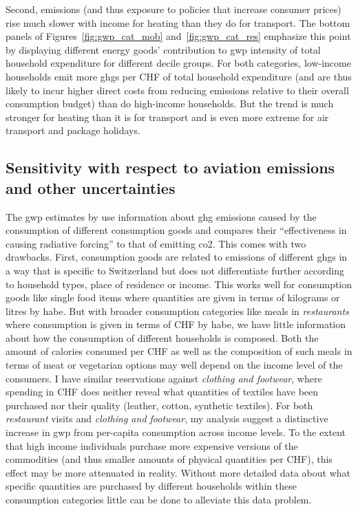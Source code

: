 \documentclass[referee, lineno, pdflatex,sn-apa]{sn-jnl}%
\theoremstyle{thmstyleone}%
\theoremstyle{thmstyletwo}%
\theoremstyle{thmstylethree}%
\begin{document}
Second, emissions (and thus exposure to policies that increase consumer prices) rise much slower with income for heating than they do for transport.
The bottom panels of Figures~\ref{fig:gwp_cat_mob} and~\ref{fig:gwp_cat_res} emphasize this point by displaying different energy goods' contribution to \ac{gwp} intensity of total household expenditure for different decile groups.
For both categories, low-income households emit more \acp{ghg} per CHF of total household expenditure (and are thus likely to incur higher direct costs from reducing emissions relative to their overall consumption budget) than do high-income households.
But the trend is much stronger for heating than it is for transport and is even more extreme for air transport and package holidays.

\clearpage

\subsection{Sensitivity with respect to aviation emissions and other uncertainties}
\label{sec:aviation}

The \ac{gwp} estimates by \citet{jakobs_nfp73_2023} use information about \ac{ghg} emissions caused by the consumption of different consumption goods and compares their ``effectiveness in causing radiative forcing'' to that of emitting \ac{co2}.
This comes with two drawbacks.
First, consumption goods are related to emissions of different \acp{ghg} in a way that is specific to Switzerland but does not differentiate further according to household types, place of residence or income.
This works well for consumption goods like single food items where quantities are given in terms of kilograms or litres by \ac{habe}.
But with broader consumption categories like meals in \emph{restaurants} where consumption is given in terms of CHF by \ac{habe}, we have little information about how the consumption of different households is composed.
Both the amount of calories consumed per CHF as well as the composition of such meals in terms of meat or vegetarian options may well depend on the income level of the consumers.
I have similar reservations against \emph{clothing and footwear}, where spending in CHF does neither reveal what quantities of textiles have been purchased nor their quality (leather, cotton, synthetic textiles).
For both \emph{restaurant} visits and \emph{clothing and footwear}, my analysis suggest a distinctive increase in \ac{gwp} from per-capita consumption across income levels.
To the extent that high income individuals purchase more expensive versions of the commodities (and thus smaller amounts of physical quantities per CHF), this effect may be more attenuated in reality.
Without more detailed data about what specific quantities are purchased by different households within these consumption categories little can be done to alleviate this data problem.
\end{document}
